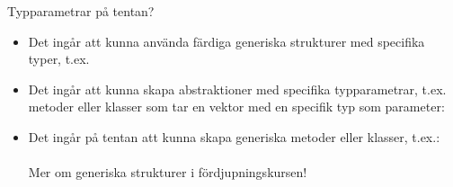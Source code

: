 \begin{Slide}{Typparametrar på tentan?}
\begin{itemize}
\item Det ingår att kunna använda färdiga generiska strukturer med specifika typer, t.ex. 

\item Det ingår att kunna skapa abstraktioner med specifika typparametrar, t.ex. metoder eller klasser som tar en vektor med en specifik typ som parameter:\\


\item Det ingår  på tentan att kunna skapa generiska metoder eller klasser, t.ex.: \\
 \\
Mer om generiska strukturer i fördjupningskursen!
\end{itemize}
\end{Slide}

\fi
